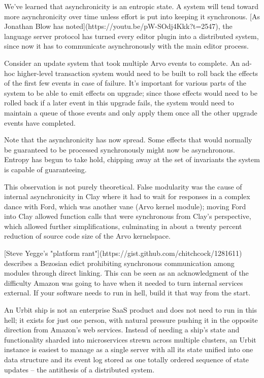 \documentclass[twoside]{article}
\begin{document}
We've learned that asynchronicity is an entropic state. A system will tend toward more asynchronicity over time unless effort is put into keeping it synchronous. [As Jonathan Blow has noted](https://youtu.be/pW-SOdj4Kkk?t=2547), the language server protocol has turned every editor plugin into a distributed system, since now it has to communicate asynchronously with the main editor process.

Consider an update system that took multiple Arvo events to complete. An ad-hoc higher-level transaction system would need to be built to roll back the effects of the first few events in case of failure. It’s important for various parts of the system to be able to emit effects on upgrade; since those effects would need to be rolled back if a later event in this upgrade fails, the system would need to maintain a queue of those events and only apply them once all the other upgrade events have completed.

Note that the asynchronicity has now spread. Some effects that would normally be guaranteed to be processed synchronously might now be asynchronous. Entropy has begun to take hold, chipping away at the set of invariants the system is capable of guaranteeing.

This observation is not purely theoretical. False modularity was the cause of internal asynchronicity in Clay where it had to wait for responses in a complex dance with Ford, which was another vane (Arvo kernel module); moving Ford into Clay allowed function calls that were synchronous from Clay’s perspective, which allowed further simplifications, culminating in about a twenty percent reduction of source code size of the Arvo kernelspace.

[Steve Yegge's "platform
rant"](https://gist.github.com/chitchcock/1281611) describes a Bezosian
edict prohibiting synchronous communication among modules through direct
linking. This can be seen as an acknowledgment of the difficulty Amazon
was going to have when it needed to turn internal services external. If
your software needs to run in hell, build it that way from the start.

An Urbit ship is not an enterprise SaaS product and does not need to run in this hell; it exists for just one person, with natural pressure pushing it in the opposite direction from Amazon’s web services. Instead of needing a ship’s state and functionality sharded into microservices strewn across multiple clusters, an Urbit instance is easiest to manage as a single server with all its state unified into one data structure and its event log stored as one totally ordered sequence of state updates -- the antithesis of a distributed system.
\end{document}
